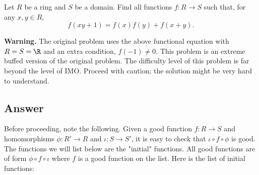 Let $R$ be a ring and $S$ be a domain.
Find all functions $f : R \to S$ such that, for any $x, y \in R$,
\[ f(xy + 1) = f(x) f(y) + f(x + y). \tag{*}\label{2012a5-eq0} \]

\textbf{Warning.}
The original problem uses the above functional equation with $R = S = \R$ and an extra condition, $f(-1) \neq 0$.
This problem is an extreme buffed version of the original problem.
The difficulty level of this problem is far beyond the level of IMO.
Proceed with caution; the solution might be very hard to understand.









\subsection*{Answer}

Before proceeding, note the following.
Given a good function $f : R \to S$ and homomorphisms $\phi : R' \to R$ and $\iota : S \to S'$, it is easy to check that $\iota \circ f \circ \phi$ is good.
The functions we will list below are the "initial" functions.
All good functions are of form $\phi \circ f \circ \iota$ where $f$ is a good function on the list.
Here is the list of initial functions:

